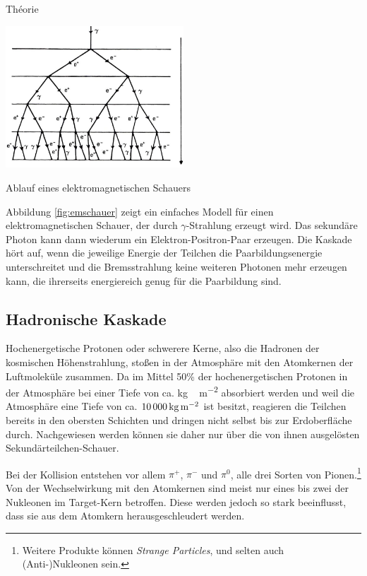 \documentclass[a4paper,11pt,liststotocnumbered,bibtotocnumbered]{scrartcl}
\begin{document}
\begin{section}{Théorie}
   \begin{figurehere}
    \center 
    \includegraphics[width=0.5\textwidth]{bilder/emschauer.jpg}   
    \caption{Ablauf eines elektromagnetischen Schauers}   
    \label{fig:emschauer}   
   \end{figurehere}
     
  Abbildung \ref{fig:emschauer} zeigt ein einfaches Modell für einen elektromagnetischen Schauer, der durch $\gamma$-Strahlung erzeugt wird. 
  Das sekundäre Photon kann dann wiederum ein Elektron-Positron-Paar erzeugen. Die Kaskade hört auf, wenn die jeweilige Energie der Teilchen die Paarbildungsenergie unterschreitet und die Bremsstrahlung keine weiteren Photonen mehr erzeugen kann, die ihrerseits energiereich genug für die Paarbildung  sind.

 
  \subsection{Hadronische Kaskade}
   Hochenergetische Protonen oder schwerere Kerne, also die Hadronen der kosmischen Höhenstrahlung, stoßen in der Atmosphäre mit den Atomkernen der Luftmoleküle zusammen. Da im Mittel 50\% der hochenergetischen Protonen in der Atmosphäre bei einer Tiefe von ca. \unit[800]{kg\,m^{-2}} absorbiert werden und weil die Atmosphäre eine Tiefe von ca. $\unit[10\,000]{kg\,m^{-2}}$ ist \cite[S.~133]{longair} besitzt, reagieren die Teilchen bereits in den obersten Schichten und dringen nicht selbst bis zur Erdoberfläche durch. Nachgewiesen werden können sie daher nur über die von ihnen ausgelösten Sekundärteilchen-Schauer.

   Bei der Kollision entstehen vor allem $\pi^+$, $\pi^-$ und $\pi^0$, alle drei Sorten von Pionen.\footnote{Weitere Produkte können \emph{Strange Particles}, und selten auch (Anti-)Nukleonen sein.} Von der Wechselwirkung mit den Atomkernen sind meist nur eines bis zwei der Nukleonen im Target-Kern betroffen. Diese werden jedoch so stark beeinflusst, dass sie aus dem Atomkern herausgeschleudert werden.


\end{section}
\end{document}
